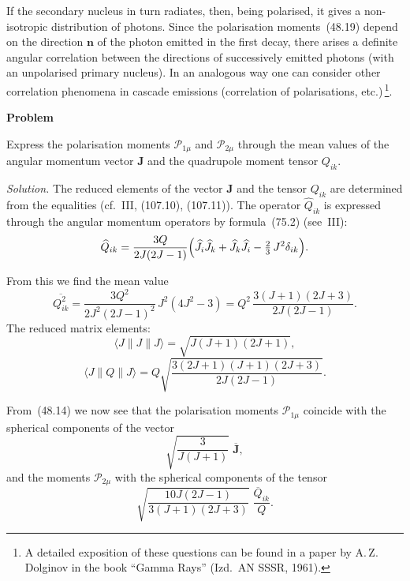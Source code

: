 If the secondary nucleus in turn radiates, then, being polarised, it gives a non-isotropic distribution of photons. Since the polarisation moments~(48.19) depend on the direction $\mathbf{n}$ of the photon emitted in the first decay, there arises a definite angular correlation between the directions of successively emitted photons (with an unpolarised primary nucleus). In an analogous way one can consider other correlation phenomena in cascade emissions (correlation of polarisations, etc.)\,\footnote{A detailed exposition of these questions can be found in a paper by A.\,Z.\,Dolginov in the book ``Gamma Rays'' (Izd.\ AN SSSR, 1961).}.

\bigskip
\begin{center}\textbf{Problem}\end{center}
\smallskip
Express the polarisation moments $\mathcal{P}_{1\mu}$ and $\mathcal{P}_{2\mu}$ through the mean values of the angular momentum vector $\mathbf{J}$ and the quadrupole moment tensor $Q_{ik}$.

\textit{Solution.} The reduced elements of the vector $\mathbf{J}$ and the tensor $Q_{ik}$ are determined from the equalities (cf.~III, (107.10), (107.11)). The operator $\widehat{Q}_{ik}$ is expressed through the angular momentum operators by formula~(75.2) (see~III):
\[
\widehat{Q}_{ik} = \frac{3Q}{2J(2J-1)}\Bigl(\widehat{J}_i\widehat{J}_k + \widehat{J}_k\widehat{J}_i - \tfrac{2}{3}\,J^2\delta_{ik}\Bigr).
\]

From this we find the mean value
\[
\overline{Q^2_{ik}} = \frac{3Q^2}{2J^2(2J-1)^2}\,J^2(4J^2 - 3) = Q^2\,\frac{3(J+1)(2J+3)}{2J(2J-1)}.
\]
The reduced matrix elements:
\[
\langle J\|J\|J\rangle = \sqrt{J(J+1)(2J+1)},
\]
\[
\langle J\|Q\|J\rangle = Q\sqrt{\frac{3(2J+1)(J+1)(2J+3)}{2J(2J-1)}}.
\]

From~(48.14) we now see that the polarisation moments $\mathcal{P}_{1\mu}$ coincide with the spherical components of the vector
\[
\sqrt{\frac{3}{J(J+1)}}\;\overline{\mathbf{J}},
\]
and the moments $\mathcal{P}_{2\mu}$ with the spherical components of the tensor
\[
\sqrt{\frac{10J(2J-1)}{3(J+1)(2J+3)}}\;\frac{\overline{Q}_{ik}}{Q}.
\]
